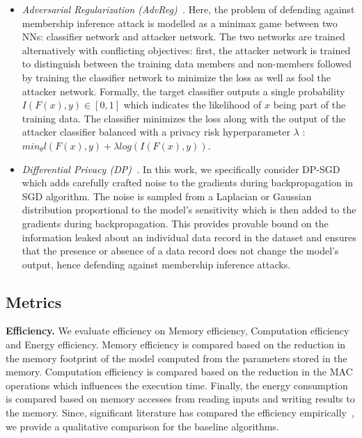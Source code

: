 \begin{itemize}[leftmargin=*]
\item {\em Adversarial Regularization (AdvReg)~\cite{DBLP:conf/ccs/NasrSH18}.} Here, the problem of defending against membership inference attack is modelled as a minimax game between two NNs: classifier network and attacker network.
The two networks are trained alternatively with conflicting objectives: first, the attacker network is trained to distinguish between the training data members and non-members followed by training the classifier network to minimize the loss as well as fool the attacker network.
Formally, the target classifier outputs a single probability $I(F(x),y) \in [0,1]$ which indicates the likelihood of $x$ being part of the training data.
The classifier minimizes the loss along with the output of the attacker classifier balanced with a privacy risk hyperparameter $\lambda$ : $min_{\theta} l(F(x),y) + \lambda log(I(F(x),y))$.

\item {\em Differential Privacy (DP)~\cite{Abadi:2016:DLD:2976749.2978318}.} In this work, we specifically consider DP-SGD which adds carefully crafted noise to the gradients during backpropagation in SGD algorithm.
The noise is sampled from a Laplacian or Gaussian distribution proportional to the model's sensitivity which is then added to the gradients during backpropagation.
This provides provable bound on the information leaked about an individual data record in the dataset and ensures that the presence or absence of a data record does not change the model's output, hence defending against membership inference attacks.
\end{itemize}

\subsection{Metrics}
\label{metrics}

\noindent\textbf{Efficiency.} We evaluate efficiency on Memory efficiency, Computation efficiency and Energy efficiency. Memory efficiency is compared based on the reduction in the memory footprint of the model computed from the parameters stored in the memory. Computation efficiency is compared based on the reduction in the MAC operations which influences the execution time. Finally, the energy consumption is compared based on memory accesses from reading inputs and writing results to the memory. Since, significant literature has compared the efficiency empirically~\cite{8114708}, we provide a qualitative comparison for the baseline algorithms.

